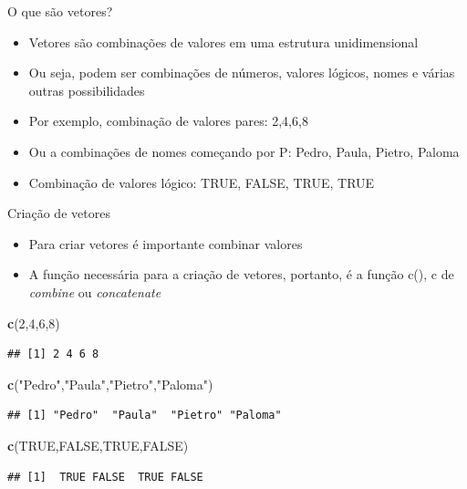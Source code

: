 \documentclass[
  10pt,
  ignorenonframetext,
]{beamer}
\newenvironment{Shaded}{\begin{snugshade}}{\end{snugshade}}
\newcommand{\DecValTok}[1]{\textcolor[rgb]{0.00,0.00,0.81}{#1}}
\newcommand{\KeywordTok}[1]{\textcolor[rgb]{0.13,0.29,0.53}{\textbf{#1}}}
\newcommand{\NormalTok}[1]{#1}
\newcommand{\OtherTok}[1]{\textcolor[rgb]{0.56,0.35,0.01}{#1}}
\newcommand{\StringTok}[1]{\textcolor[rgb]{0.31,0.60,0.02}{#1}}
\providecommand{\tightlist}{%
  \setlength{\itemsep}{0pt}\setlength{\parskip}{0pt}}
\begin{document}
\begin{frame}{O que são vetores?}
\protect\hypertarget{o-que-suxe3o-vetores}{}
\begin{itemize}
\tightlist
\item
  Vetores são combinações de valores em uma estrutura unidimensional
\item
  Ou seja, podem ser combinações de números, valores lógicos, nomes e
  várias outras possibilidades
\item
  Por exemplo, combinação de valores pares: 2,4,6,8
\item
  Ou a combinações de nomes começando por P: Pedro, Paula, Pietro,
  Paloma
\item
  Combinação de valores lógico: TRUE, FALSE, TRUE, TRUE
\end{itemize}
\end{frame}

\begin{frame}[fragile]{Criação de vetores}
\protect\hypertarget{criauxe7uxe3o-de-vetores}{}
\begin{itemize}
\tightlist
\item
  Para criar vetores é importante combinar valores
\item
  A função necessária para a criação de vetores, portanto, é a função
  c(), c de \emph{combine} ou \emph{concatenate}
\end{itemize}

\begin{Shaded}
\begin{Highlighting}[]
\KeywordTok{c}\NormalTok{(}\DecValTok{2}\NormalTok{,}\DecValTok{4}\NormalTok{,}\DecValTok{6}\NormalTok{,}\DecValTok{8}\NormalTok{)}
\end{Highlighting}
\end{Shaded}

\begin{verbatim}
## [1] 2 4 6 8
\end{verbatim}

\begin{Shaded}
\begin{Highlighting}[]
\KeywordTok{c}\NormalTok{(}\StringTok{"Pedro"}\NormalTok{,}\StringTok{"Paula"}\NormalTok{,}\StringTok{"Pietro"}\NormalTok{,}\StringTok{"Paloma"}\NormalTok{)}
\end{Highlighting}
\end{Shaded}

\begin{verbatim}
## [1] "Pedro"  "Paula"  "Pietro" "Paloma"
\end{verbatim}

\begin{Shaded}
\begin{Highlighting}[]
\KeywordTok{c}\NormalTok{(}\OtherTok{TRUE}\NormalTok{,}\OtherTok{FALSE}\NormalTok{,}\OtherTok{TRUE}\NormalTok{,}\OtherTok{FALSE}\NormalTok{)}
\end{Highlighting}
\end{Shaded}

\begin{verbatim}
## [1]  TRUE FALSE  TRUE FALSE
\end{verbatim}
\end{frame}
\end{document}
